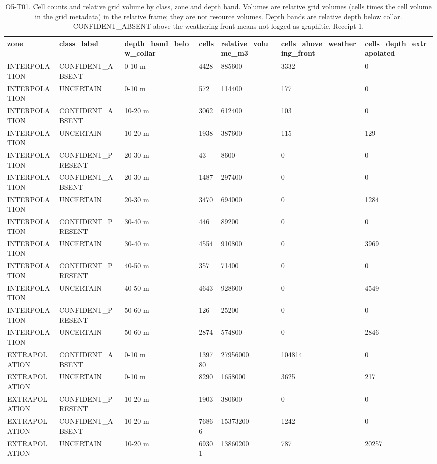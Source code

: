 \begin{table}[ht]
\centering
\scriptsize
\caption{O5-T01. Cell counts and relative grid volume by class, zone and depth band. Volumes are relative grid volumes (cells times the cell volume in the grid metadata) in the relative frame; they are not resource volumes. Depth bands are relative depth below collar. CONFIDENT\_ABSENT above the weathering front means not logged as graphitic. Receipt 1.}
\label{tab:O5T01}
\begin{tabular}{lllllll}
\toprule
zone & class\_label & depth\_band\_below\_collar & cells & relative\_volume\_m3 & cells\_above\_weathering\_front & cells\_depth\_extrapolated \\
\midrule
INTERPOLATION & CONFIDENT\_ABSENT & 0-10 m & 4428 & 885600 & 3332 & 0 \\
INTERPOLATION & UNCERTAIN & 0-10 m & 572 & 114400 & 177 & 0 \\
INTERPOLATION & CONFIDENT\_ABSENT & 10-20 m & 3062 & 612400 & 103 & 0 \\
INTERPOLATION & UNCERTAIN & 10-20 m & 1938 & 387600 & 115 & 129 \\
INTERPOLATION & CONFIDENT\_PRESENT & 20-30 m & 43 & 8600 & 0 & 0 \\
INTERPOLATION & CONFIDENT\_ABSENT & 20-30 m & 1487 & 297400 & 0 & 0 \\
INTERPOLATION & UNCERTAIN & 20-30 m & 3470 & 694000 & 0 & 1284 \\
INTERPOLATION & CONFIDENT\_PRESENT & 30-40 m & 446 & 89200 & 0 & 0 \\
INTERPOLATION & UNCERTAIN & 30-40 m & 4554 & 910800 & 0 & 3969 \\
INTERPOLATION & CONFIDENT\_PRESENT & 40-50 m & 357 & 71400 & 0 & 0 \\
INTERPOLATION & UNCERTAIN & 40-50 m & 4643 & 928600 & 0 & 4549 \\
INTERPOLATION & CONFIDENT\_PRESENT & 50-60 m & 126 & 25200 & 0 & 0 \\
INTERPOLATION & UNCERTAIN & 50-60 m & 2874 & 574800 & 0 & 2846 \\
EXTRAPOLATION & CONFIDENT\_ABSENT & 0-10 m & 139780 & 27956000 & 104814 & 0 \\
EXTRAPOLATION & UNCERTAIN & 0-10 m & 8290 & 1658000 & 3625 & 217 \\
EXTRAPOLATION & CONFIDENT\_PRESENT & 10-20 m & 1903 & 380600 & 0 & 0 \\
EXTRAPOLATION & CONFIDENT\_ABSENT & 10-20 m & 76866 & 15373200 & 1242 & 0 \\
EXTRAPOLATION & UNCERTAIN & 10-20 m & 69301 & 13860200 & 787 & 20257 \\

\end{tabular}
\end{table}
